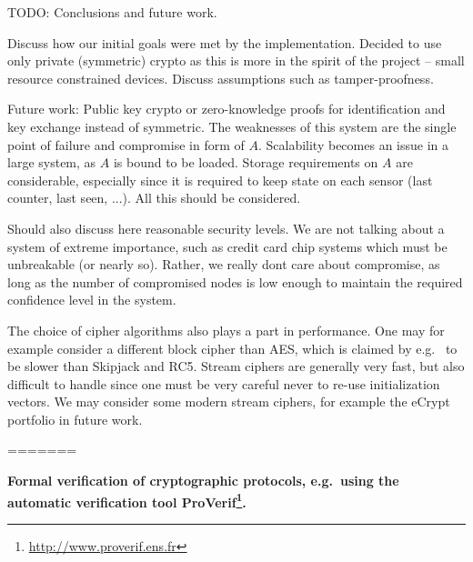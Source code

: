 TODO: Conclusions and future work.

Discuss how our initial goals were met by the implementation. Decided to use only private (symmetric) crypto as this is more in the spirit of the project -- small resource constrained devices. Discuss assumptions such as tamper-proofness.

Future work: Public key crypto or zero-knowledge proofs for identification and key exchange instead of symmetric. The weaknesses of this system are the single point of failure and compromise in form of $A$. Scalability becomes an issue in a large system, as $A$ is bound to be loaded. Storage requirements on $A$ are considerable, especially since it is required to keep state on each sensor (last counter, last seen, ...). All this should be considered.

Should also discuss here reasonable security levels. We are not talking about a system of extreme importance, such as credit card chip systems which must be unbreakable (or nearly so). Rather, we really dont care about compromise, as long as the number of compromised nodes is low enough to maintain the required confidence level in the system.

The choice of cipher algorithms also plays a part in performance. One may for example consider a different block cipher than AES, which is claimed by e.g.\  to be slower than Skipjack and RC5. Stream ciphers are generally very fast, but also difficult to handle since one must be very careful never to re-use initialization vectors. We may consider some modern stream ciphers, for example the eCrypt portfolio in future work.


=======

\textbf{Formal verification of cryptographic protocols, e.g.\ using the automatic verification tool ProVerif\footnote{\url{http://www.proverif.ens.fr}}.}